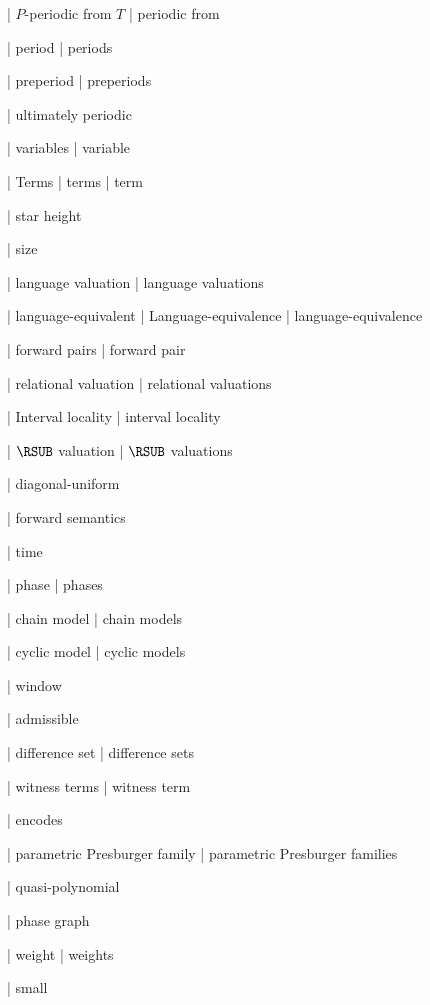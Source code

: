 
%
%
 | $P$-periodic from $T$
 | periodic from

 | period
 | periods

 | preperiod
 | preperiods

 | ultimately periodic

%
%
 | variables
 | variable

 | Terms
 | terms
 | term

 | star height

 | size

%
%
 | language valuation
 | language valuations

 | language-equivalent
 | Language-equivalence
 | language-equivalence

 | forward pairs
 | forward pair

 | relational valuation
 | relational valuations

 | Interval locality
 | interval locality

 | $\RSUB$ valuation
 | $\RSUB$ valuations

 | diagonal-uniform

 | forward semantics

%
%
 | time

 | phase
 | phases

 | chain model
 | chain models

 | cyclic model
 | cyclic models

 | window

 | admissible

 | difference set
 | difference sets

%
%
 | witness terms
 | witness term

 | encodes

%
%
 | parametric Presburger family
 | parametric Presburger families


 | quasi-polynomial

 | phase graph

 | weight
 | weights

 | small

